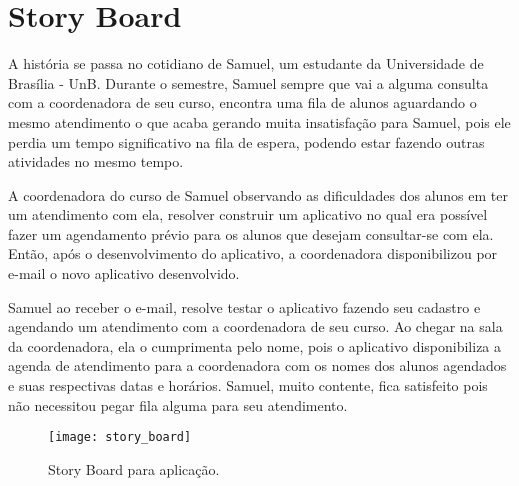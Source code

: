 \chapter[Story Board]{Story Board}
\label{chap:storyBoard}
	
	A história se passa no cotidiano de Samuel, um estudante da Universidade de Brasília - UnB. Durante o semestre, Samuel sempre que vai a alguma consulta com a coordenadora de seu curso, encontra uma fila de alunos aguardando o mesmo atendimento o que acaba gerando muita insatisfação para Samuel, pois ele perdia um tempo significativo na fila de espera, podendo estar fazendo outras atividades no mesmo tempo. 

	A coordenadora do curso de Samuel observando as dificuldades dos alunos em ter um atendimento com ela, resolver construir um aplicativo no qual era possível fazer um agendamento prévio para os alunos que desejam consultar-se com ela. Então, após o desenvolvimento do aplicativo, a coordenadora disponibilizou por e-mail o novo aplicativo desenvolvido. 
	
	Samuel ao receber o e-mail, resolve testar o aplicativo fazendo seu cadastro e agendando um atendimento com a coordenadora de seu curso. Ao chegar na sala da coordenadora, ela o cumprimenta pelo nome, pois o aplicativo disponibiliza a agenda de atendimento para a coordenadora com os nomes dos alunos agendados e suas respectivas datas e horários. Samuel, muito contente, fica satisfeito pois não necessitou pegar fila alguma para seu atendimento. 

	\newpage

	\begin{figure}[h]
		\centering
		\texttt{[image: story\_board]}
		\caption[Story Board para aplicação]{Story Board para aplicação.}
		\label{fig:metas_Experiencia_Usuario}
	\end{figure}